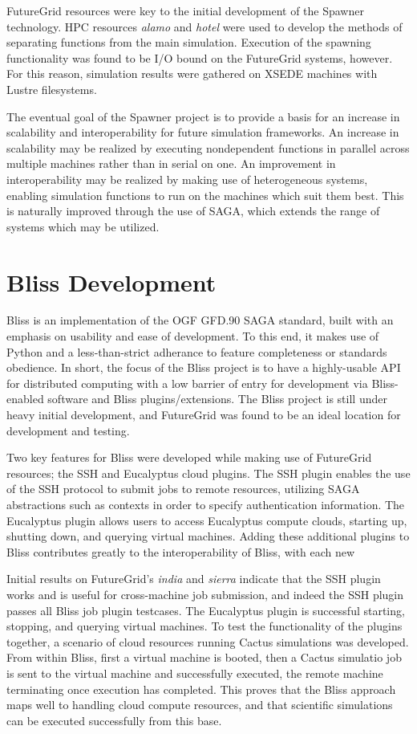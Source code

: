 \documentclass[]{paper}
\begin{document}
FutureGrid resources were key to the initial development of the Spawner technology.
HPC resources \textit{alamo} and \textit{hotel} were used to develop the methods of separating functions
from the main simulation.  Execution of the spawning functionality was found to be I/O
bound on the FutureGrid systems, however.  For this reason, simulation results were gathered
on XSEDE machines with Lustre filesystems.

The eventual goal of the Spawner project is to provide a basis for an increase in
scalability and interoperability for future simulation frameworks.  An increase in scalability
may be realized by executing nondependent functions in parallel across multiple machines rather
than in serial on one.  An improvement in interoperability may be realized by making use of heterogeneous systems,
enabling simulation functions to run on the machines which suit them best.  This is naturally improved through
the use of SAGA, which extends the range of systems which may be utilized.

\section{Bliss Development}
Bliss is an implementation of the OGF GFD.90 SAGA standard, built with an emphasis
on usability and ease of development.  To this end, it makes use of Python and a
less-than-strict adherance to feature completeness or standards obedience.
In short, the focus of the Bliss project is to have a highly-usable API for distributed
computing with a low barrier of entry for development via Bliss-enabled software
and Bliss plugins/extensions.  The Bliss project is still under heavy 
initial development, and FutureGrid was found to be an ideal location for development and testing.

Two key features for Bliss were developed while making use of FutureGrid resources; 
the SSH and Eucalyptus cloud plugins.  The SSH plugin enables the use of the SSH protocol
to submit jobs to remote resources, utilizing SAGA abstractions such as contexts in order
to specify authentication information.  The Eucalyptus plugin allows users to access
Eucalyptus compute clouds, starting up, shutting down, and querying virtual machines.
Adding these additional plugins to Bliss contributes greatly to the interoperability of
Bliss, with each new

Initial results on FutureGrid's \textit{india} and \textit{sierra} indicate that the
SSH plugin works and is useful for cross-machine
job submission, and indeed the SSH plugin passes all Bliss job plugin testcases.
The Eucalyptus plugin is successful starting, stopping, and querying virtual machines.
To test the functionality of the plugins together, a scenario of cloud resources running
Cactus simulations was developed.  From within Bliss, first a virtual machine is booted, 
then a Cactus simulatio job is sent to the virtual machine and successfully executed,
 the remote machine terminating
once execution has completed.  This proves that the Bliss approach maps well to handling
cloud compute resources, and that scientific simulations can be executed successfully from this
base.
\end{document}
